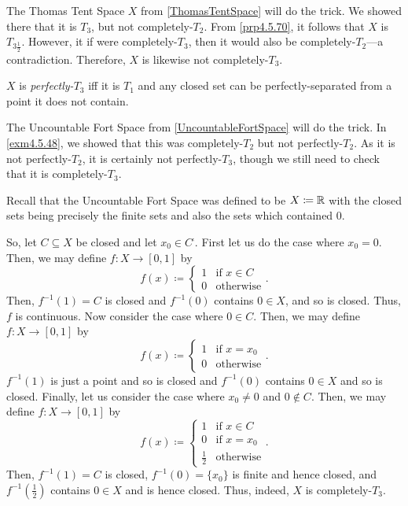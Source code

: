 \begin{exm}
The Thomas Tent Space $X$ from \cref{ThomasTentSpace} will do the trick.  We showed there that it is $T_3$, but not completely-$T_2$.  From \cref{prp4.5.70}, it follows that $X$ is $T_{3\frac{1}{2}}$.  However, it if were completely-$T_3$, then it would also be completely-$T_2$---a contradiction.  Therefore, $X$ is likewise not completely-$T_3$.
\end{exm}
\begin{dfn}[Perfectly-$T_3$]\label{PerfectlyT3}
$X$ is \emph{perfectly-$T_3$} iff it is $T_1$ and any closed set can be perfectly-separated from a point it does not contain.
\end{dfn}
\begin{exm}\label{exm4.6.80}
The Uncountable Fort Space from \cref{UncountableFortSpace} will do the trick.  In \cref{exm4.5.48}, we showed that this was completely-$T_2$ but not perfectly-$T_2$.  As it is not perfectly-$T_2$, it is certainly not perfectly-$T_3$, though we still need to check that it is completely-$T_3$.

Recall that the Uncountable Fort Space was defined to be $X\coloneqq \mathbb{R}$ with the closed sets being precisely the finite sets and also the sets which contained $0$.

So, let $C\subseteq X$ be closed and let $x_0\in C^{\comp}$.  First let us do the case where $x_0=0$.  Then, we may define $f:X\rightarrow [0,1]$ by
\begin{equation}
f(x)\coloneqq \begin{cases}1 & \text{if }x\in C \\ 0 & \text{otherwise}\end{cases}.
\end{equation}
Then, $f^{-1}(1)=C$ is closed and $f^{-1}(0)$ contains $0\in X$, and so is closed.  Thus, $f$ is continuous.  Now consider the case where $0\in C$.  Then, we may define $f:X\rightarrow [0,1]$ by
\begin{equation}
f(x)\coloneqq \begin{cases}1 & \text{if }x=x_0 \\ 0 & \text{otherwise}\end{cases}.
\end{equation}
$f^{-1}(1)$ is just a point and so is closed and $f^{-1}(0)$ contains $0\in X$ and so is closed.  Finally, let us consider the case where $x_0\neq 0$ and $0\notin C$.  Then, we may define $f:X\rightarrow [0,1]$ by
\begin{equation}
f(x)\coloneqq \begin{cases}1 & \text{if }x\in C \\ 0 & \text{if }x=x_0 \\ \tfrac{1}{2} & \text{otherwise}\end{cases}.
\end{equation}
Then, $f^{-1}(1)=C$ is closed, $f^{-1}(0)=\{ x_0\}$ is finite and hence closed, and $f^{-1}(\frac{1}{2})$ contains $0\in X$ and is hence closed.  Thus, indeed, $X$ is completely-$T_3$.
\end{exm}


